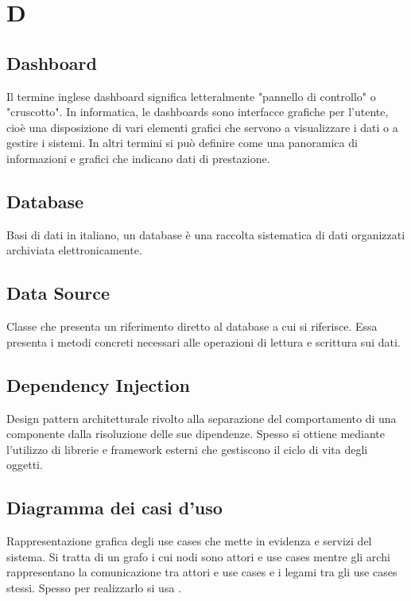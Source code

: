 \chapter{D}


\section{Dashboard}
Il termine inglese dashboard significa letteralmente "pannello di controllo" o "cruscotto". In informatica, le dashboards sono interfacce grafiche per l'utente, cioè una disposizione di vari elementi grafici che servono a visualizzare i dati o a gestire i sistemi. In altri termini si può definire come una panoramica di informazioni e grafici che indicano dati di prestazione.

\section{Database}
Basi di dati in italiano, un database è una raccolta sistematica di dati organizzati archiviata elettronicamente.

\section{Data Source}\label{sec:Data Sources}
Classe che presenta un riferimento diretto al database a cui si riferisce. Essa presenta i metodi concreti necessari alle operazioni di lettura e scrittura sui dati.

\section{Dependency Injection}
Design pattern architetturale rivolto alla separazione del comportamento di una componente dalla risoluzione delle sue dipendenze. Spesso si ottiene mediante l'utilizzo di librerie e framework esterni che gestiscono il ciclo di vita degli oggetti.

\section{Diagramma dei casi d'uso}\label{sec:Diagrammi dei casi d'uso}
Rappresentazione grafica degli use cases che mette in evidenza  e servizi del sistema. Si tratta di un grafo i cui nodi sono attori e use cases mentre gli archi rappresentano la comunicazione tra attori e use cases e i legami tra gli use cases stessi. Spesso per realizzarlo si usa .

